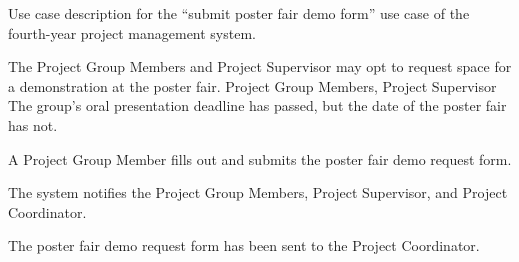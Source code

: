\begin{table}
  \centering
  \caption{Use case description for the ``submit poster fair demo form'' use case of the fourth-year project management system.}
  \label{tbl:use-case-poster-fair-form}

  \begin{usecase}
    The Project Group Members and Project Supervisor may opt to request space for a demonstration at the poster fair.
    Project Group Members, Project Supervisor
    The group’s oral presentation deadline has passed, but the date of the poster fair has not.
    \ucnormal
    \begin{ucenum}
      \item A Project Group Member fills out and submits the poster fair demo request form.
      \item The system notifies the Project Group Members, Project Supervisor, and Project Coordinator.
    \end{ucenum}
    The poster fair demo request form has been sent to the Project Coordinator.
  \end{usecase}
\end{table}


